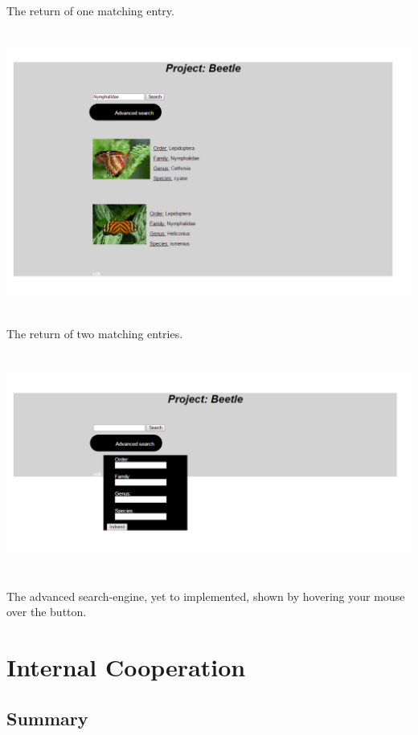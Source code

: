 \documentclass[12pt,a4paper]{article}
\begin{document}
The return of one matching entry.\\
\includegraphics[height=100mm]{Prototype4.png}\\
The return of two matching entries.\\
\includegraphics[height=80mm]{Prototype5.png}\\
The advanced search-engine, yet to implemented, shown by hovering your mouse over the button.\\

\newpage

\section{Internal Cooperation}
\subsection{Summary}
\end{document}
